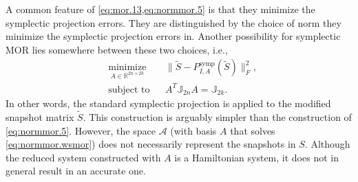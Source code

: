 \begin{rem}
A common feature of \cref{eq:mor.13,eq:normmor.5} is that they minimize the symplectic projection errors. They are distinguished by the choice of norm they minimize the symplectic projection errors in. Another possibility for symplectic MOR lies somewhere between these two choices, i.e.,
\begin{equation} \label{eq:normmor.wsmor}
\begin{aligned}
& \underset{ A\in \mathbb{R}^{2n\times 2k}}{\text{minimize}}
& & \| \tilde S - P^\text{symp}_{I, A}(\tilde S) \|_F^2, \\
& \text{subject to}
& & A^T \mathbb J_{2n} A = \mathbb J_{2k}.
\end{aligned}
\end{equation}
In other words, the standard symplectic projection is applied to the modified snapshot matrix $\tilde S$. This construction is arguably simpler than the construction of \cref{eq:normmor.5}. However, the space $\mathcal A$ (with basis $A$ that solves \eqref{eq:normmor.wsmor}) does not necessarily represent the snapshots in $S$. Although the reduced system constructed with $A$ is a Hamiltonian system, it does not in general result in an accurate one.
\end{rem}

